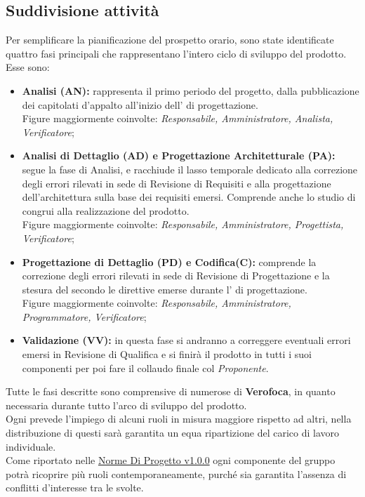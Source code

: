 \documentclass{scalatekids-article}
\begin{document}
\subsection{Suddivisione attività}
\label{sub:fasi}
Per semplificare la pianificazione del prospetto orario, sono state identificate
quattro fasi principali che rappresentano l'intero ciclo di sviluppo del prodotto.\\
Esse sono:
\begin{itemize}
\item\textbf{Analisi (AN):} rappresenta il primo periodo del progetto,
dalla
  pubblicazione dei capitolati d'appalto all'inizio dell' di progettazione.\\
  Figure maggiormente coinvolte: \textit{Responsabile, Amministratore, Analista, Verificatore};
\item\textbf{Analisi di Dettaglio (AD) e Progettazione Architetturale (PA):} segue la fase di Analisi, e
  racchiude il lasso temporale dedicato alla correzione degli errori rilevati in
  sede di Revisione di Requisiti e alla progettazione dell'architettura sulla
  base dei requisiti emersi. Comprende anche lo studio di 
  congrui alla realizzazione del prodotto.\\ Figure maggiormente coinvolte:
  \textit{Responsabile, Amministratore, Progettista, Verificatore};
\item\textbf{Progettazione di Dettaglio (PD) e Codifica(C):} comprende la correzione degli errori rilevati in sede di Revisione di Progettazione e la stesura del  secondo le direttive emerse durante l' di progettazione.\\Figure maggiormente coinvolte:
  \textit{Responsabile, Amministratore, Programmatore, Verificatore};
\item\textbf{Validazione (VV):} in questa fase si andranno a correggere eventuali errori emersi in Revisione di Qualifica e si finirà il prodotto in tutti i suoi componenti per poi fare il collaudo finale col \textit{Proponente}.
\end{itemize}
Tutte le fasi descritte sono comprensive di numerose  di \textbf{Verofoca}, in quanto necessaria durante tutto l'arco di sviluppo del prodotto.\\Ogni {} prevede l'impiego di alcuni ruoli in misura maggiore rispetto ad altri, nella distribuzione di questi sarà garantita un equa ripartizione del
carico di lavoro individuale.\\
Come riportato nelle \href{run:../Interni/NormeDiProgetto\_v1.0.0.pdf}{Norme Di Progetto v1.0.0} ogni componente del gruppo potrà ricoprire più ruoli contemporaneamente, purché sia garantita l'assenza di conflitti d'interesse tra le  svolte.\\ \\
\end{document}
